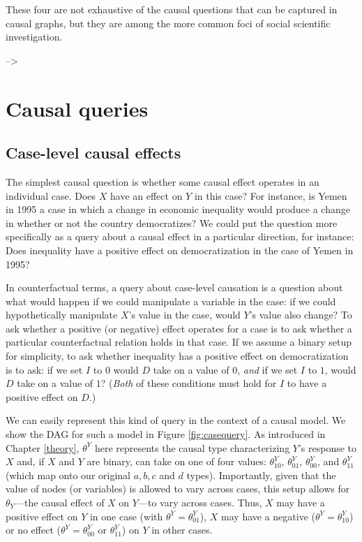 \documentclass[12pt,]{book}
\begin{document}
These four are not exhaustive of the causal questions that can be captured in causal graphs, but they are among the more common foci of social scientific investigation.

--\textgreater{}

\hypertarget{causal-queries}{%
\section{Causal queries}\label{causal-queries}}

\hypertarget{case-level-causal-effects}{%
\subsection{Case-level causal effects}\label{case-level-causal-effects}}

The simplest causal question is whether some causal effect operates in an individual case. Does \(X\) have an effect on \(Y\) in this case? For instance, is Yemen in 1995 a case in which a change in economic inequality would produce a change in whether or not the country democratizes? We could put the question more specifically as a query about a causal effect in a particular direction, for instance: Does inequality have a positive effect on democratization in the case of Yemen in 1995?

In counterfactual terms, a query about case-level causation is a question about what would happen if we could manipulate a variable in the case: if we could hypothetically manipulate \(X\)'s value in the case, would \(Y\)'s value also change? To ask whether a positive (or negative) effect operates for a case is to ask whether a particular counterfactual relation holds in that case. If we assume a binary setup for simplicity, to ask whether inequality has a positive effect on democratization is to ask: if we set \(I\) to \(0\) would \(D\) take on a value of \(0\), \emph{and} if we set \(I\) to \(1\), would \(D\) take on a value of \(1\)? (\emph{Both} of these conditions must hold for \(I\) to have a positive effect on \(D\).)

We can easily represent this kind of query in the context of a causal model. We show the DAG for such a model in Figure \ref{fig:casequery}. As introduced in Chapter \ref{theory}, \(\theta^Y\) here represents the causal type characterizing \(Y\)'s response to \(X\) and, if \(X\) and \(Y\) are binary, can take on one of four values: \(\theta^Y_{10}\), \(\theta^Y_{01}\), \(\theta^Y_{00}\), and \(\theta^Y_{11}\) (which map onto our original \(a, b, c\) and \(d\) types). Importantly, given that the value of nodes (or variables) is allowed to vary across cases, this setup allows for \(\theta_Y\)---the causal effect of \(X\) on \(Y\)---to vary across cases. Thus, \(X\) may have a positive effect on \(Y\) in one case (with \(\theta^Y=\theta^Y_{01}\)), \(X\) may have a negative (\(\theta^Y=\theta^Y_{10}\)) or no effect (\(\theta^Y=\theta^Y_{00}\) or \(\theta^Y_{11}\)) on \(Y\) in other cases.
\end{document}
